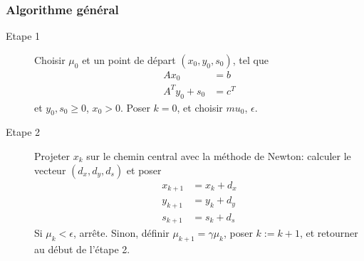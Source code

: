 \documentclass[usepdftitle=false]{beamer}
\begin{document}
\begin{frame}
\frametitle{Algorithme général}

\begin{description}
\item[Etape 1]
Choisir $\mu_0$ et un point de départ $(x_0, y_0, s_0)$, tel que
\begin{align*}
Ax_0 &= b \\
A^Ty_0 + s_0 &= c^T
\end{align*}
et $y_0, s_0 \geq 0$, $x_0 > 0$. Poser $k = 0$, et choisir $mu_0$, $\epsilon$.
\item[Etape 2]
Projeter $x_k$ sur le chemin central avec la méthode de Newton: calculer le vecteur $(d_x, d_y, d_s)$ et poser
\begin{align*}
x_{k+1} &= x_k + d_x \\
y_{k+1} &= y_k + d_y \\
s_{k+1} &= s_k + d_s
\end{align*}
Si $\mu_k < \epsilon$, arrête.
Sinon, définir $\mu_{k + 1} = \gamma \mu_k$, poser $k := k+1$, et retourner au début de l'étape 2.
\end{description}

\end{frame}
\end{document}
